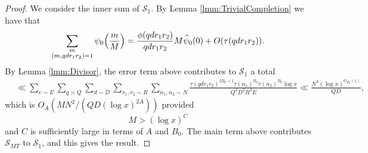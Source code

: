 \documentclass[10pt]{amsart}
\theoremstyle{plain}
\numberwithin{equation}{section}
\renewcommand{\hat}[1]{\widehat #1}
\begin{document}
%
%
%
%
\begin{proof}
We consider the inner sum of $\mathscr{S}_1$. By Lemma \ref{lmm:TrivialCompletion} we have that
\[
\sum_{\substack{m\\ (m,q d r_1r_2)=1}} \psi_0\Bigl(\frac{m}{M}\Bigr)=\frac{\phi(q d r_1 r_2)}{q d r_1 r_2}M\hat{\psi}_0(0)+O(\tau(q d r_1r_2)).
\]
By Lemma \ref{lmm:Divisor}, the error term above contributes to $\mathscr{S}_1$ a total
\begin{align*}
&\ll \sum_{e\sim E}\sum_{q\asymp Q}\sum_{d\sim D}\sum_{r_1,r_2\sim R}\sum_{n_1,n_2\sim N}\frac{\tau( q d r_1r_2)^{2B_0+1}\tau(n_1)^{B_0}\tau(n_2)^{B_0}\log{x}}{Q^2 D^2 R^2 E}\ll \frac{N^2(\log{x})^{O_{B_0}(1)}}{Q D},
\end{align*}
which is $O_A(MN^2/(Q D(\log{x})^{2A}))$ provided
\begin{equation}
M>(\log{x})^C
\end{equation}
 and $C$ is sufficiently large in terms of $A$ and $B_0$. The main term above contributes $\mathscr{S}_{MT}$ to $\mathscr{S}_1$, and this gives the result.
 \end{proof}
%
%
%
%
%
%
%
\end{document}
